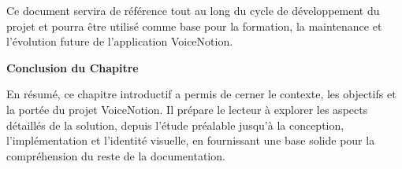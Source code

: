 Ce document servira de référence tout au long du cycle de développement du projet et pourra être utilisé comme base pour la formation, la maintenance et l'évolution future de l'application VoiceNotion. 

\vspace{1cm}
\begin{center}
\textbf{\large Conclusion du Chapitre}
\end{center}

\noindent
En résumé, ce chapitre introductif a permis de cerner le contexte, les objectifs et la portée du projet VoiceNotion. Il prépare le lecteur à explorer les aspects détaillés de la solution, depuis l'étude préalable jusqu'à la conception, l'implémentation et l'identité visuelle, en fournissant une base solide pour la compréhension du reste de la documentation.